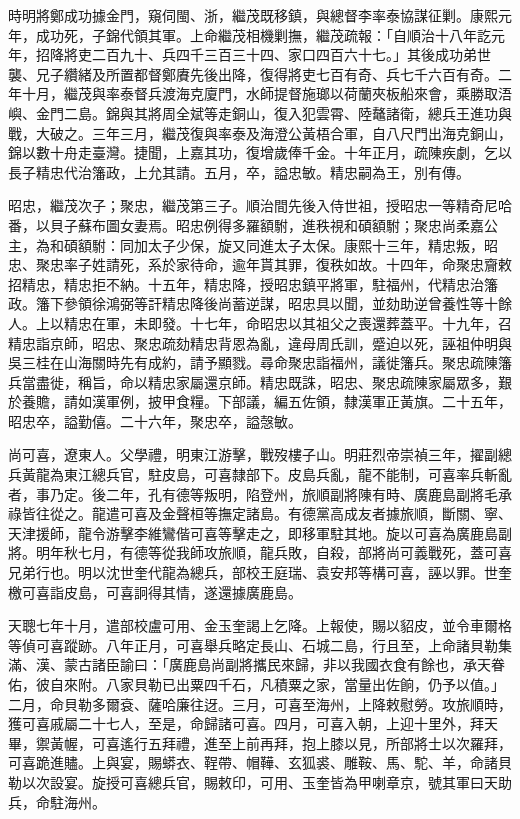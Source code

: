 \begin{pinyinscope}
時明將鄭成功據金門，窺伺閩、浙，繼茂既移鎮，與總督李率泰協謀征剿。康熙元年，成功死，子錦代領其軍。上命繼茂相機剿撫，繼茂疏報：「自順治十八年訖元年，招降將吏二百九十、兵四千三百三十四、家口四百六十七。」其後成功弟世襲、兄子纘緒及所置都督鄭賡先後出降，復得將吏七百有奇、兵七千六百有奇。二年十月，繼茂與率泰督兵渡海克廈門，水師提督施瑯以荷蘭夾板船來會，乘勝取浯嶼、金門二島。錦與其將周全斌等走銅山，復入犯雲霄、陸鼇諸衛，總兵王進功與戰，大破之。三年三月，繼茂復與率泰及海澄公黃梧合軍，自八尺門出海克銅山，錦以數十舟走臺灣。捷聞，上嘉其功，復增歲俸千金。十年正月，疏陳疾劇，乞以長子精忠代治籓政，上允其請。五月，卒，謚忠敏。精忠嗣為王，別有傳。

昭忠，繼茂次子；聚忠，繼茂第三子。順治間先後入侍世祖，授昭忠一等精奇尼哈番，以貝子蘇布圖女妻焉。昭忠例得多羅額駙，進秩視和碩額駙；聚忠尚柔嘉公主，為和碩額駙：同加太子少保，旋又同進太子太保。康熙十三年，精忠叛，昭忠、聚忠率子姓請死，系於家待命，逾年貰其罪，復秩如故。十四年，命聚忠齎敕招精忠，精忠拒不納。十五年，精忠降，授昭忠鎮平將軍，駐福州，代精忠治籓政。籓下參領徐鴻弼等訐精忠降後尚蓄逆謀，昭忠具以聞，並劾助逆曾養性等十餘人。上以精忠在軍，未即發。十七年，命昭忠以其祖父之喪還葬蓋平。十九年，召精忠詣京師，昭忠、聚忠疏劾精忠背恩為亂，違母周氏訓，蹙迫以死，誣祖仲明與吳三桂在山海關時先有成約，請予顯戮。尋命聚忠詣福州，議徙籓兵。聚忠疏陳籓兵當盡徙，稱旨，命以精忠家屬還京師。精忠既誅，昭忠、聚忠疏陳家屬眾多，艱於養贍，請如漢軍例，披甲食糧。下部議，編五佐領，隸漢軍正黃旗。二十五年，昭忠卒，謚勤僖。二十六年，聚忠卒，謚愨敏。

尚可喜，遼東人。父學禮，明東江游擊，戰歿樓子山。明莊烈帝崇禎三年，擢副總兵黃龍為東江總兵官，駐皮島，可喜隸部下。皮島兵亂，龍不能制，可喜率兵斬亂者，事乃定。後二年，孔有德等叛明，陷登州，旅順副將陳有時、廣鹿島副將毛承祿皆往從之。龍遣可喜及金聲桓等撫定諸島。有德黨高成友者據旅順，斷關、寧、天津援師，龍令游擊李維鸞偕可喜等擊走之，即移軍駐其地。旋以可喜為廣鹿島副將。明年秋七月，有德等從我師攻旅順，龍兵敗，自殺，部將尚可義戰死，蓋可喜兄弟行也。明以沈世奎代龍為總兵，部校王庭瑞、袁安邦等構可喜，誣以罪。世奎檄可喜詣皮島，可喜詗得其情，遂還據廣鹿島。

天聰七年十月，遣部校盧可用、金玉奎謁上乞降。上報使，賜以貂皮，並令車爾格等偵可喜蹤跡。八年正月，可喜舉兵略定長山、石城二島，行且至，上命諸貝勒集滿、漢、蒙古諸臣諭曰：「廣鹿島尚副將攜民來歸，非以我國衣食有餘也，承天眷佑，彼自來附。八家貝勒已出粟四千石，凡積粟之家，當量出佐餉，仍予以值。」二月，命貝勒多爾袞、薩哈廉往迓。三月，可喜至海州，上降敕慰勞。攻旅順時，獲可喜戚屬二十七人，至是，命歸諸可喜。四月，可喜入朝，上迎十里外，拜天畢，禦黃幄，可喜遙行五拜禮，進至上前再拜，抱上膝以見，所部將士以次羅拜，可喜跪進贐。上與宴，賜蟒衣、鞓帶、帽鞾、玄狐裘、雕鞍、馬、駝、羊，命諸貝勒以次設宴。旋授可喜總兵官，賜敕印，可用、玉奎皆為甲喇章京，號其軍曰天助兵，命駐海州。


\end{pinyinscope}
